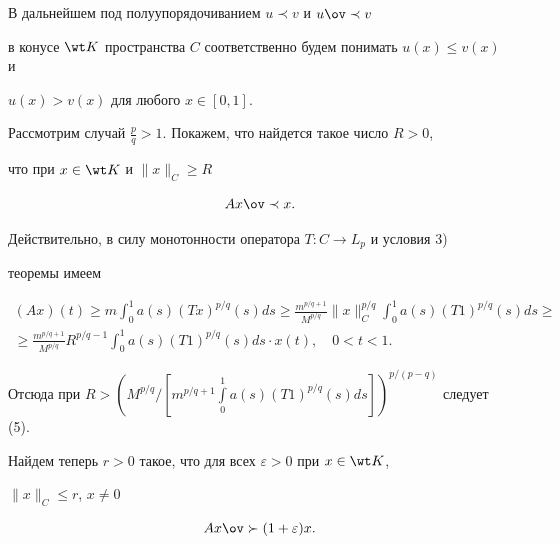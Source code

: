 \begin{pf} 


В дальнейшем под полуупорядочиванием $u\prec v$ и $u\ov\prec v$ 


в конусе $\wt K$ пространства $C$ соответственно будем понимать $u(x)\le 


v(x)$ и 


$u(x)>v(x)$ для любого $x\in[0,1]$. 


 


Рассмотрим случай $\frac{p}{q}>1$. Покажем, что найдется такое число $R>0$, 


что при $x\in\wt K$ и $\|x\|_C\ge R$ 


\begin{equation} 


Ax\ov\prec x. 


\end{equation} 


Действительно, в силу монотонности оператора $T:C\to L_p$ и условия 3) 


теоремы имеем 


\begin{multline*} 


(Ax)(t)\ge m\int^1_0 a(s)(Tx)^{p/q}(s)ds\ge 


\frac{m^{p/q+1}}{M^{p/q}}\|x\|^{p/q}_C\int^1_0 


a(s)(T1)^{p/q}(s)ds\ge \\ 


% 


\ge \frac{m^{p/q+1}}{M^{p/q}}R^{p/q-1}\int^1_0 


a(s)(T1)^{p/q}(s)ds\cdot x(t),\quad 0<t<1. 


\end{multline*} 


Отсюда при $R>\left( M^{p/q}\Big/\left[ m^{p/q+1} \int\limits^1_0 


a(s)(T1)^{p/q}(s)ds\right] \right)^{p/(p-q)}$ следует (5). 


 


Найдем теперь $r>0$ такое, что для всех $\varepsilon>0$ при $x\in\wt K$, 


$\|x\|_C\le r$, $x\ne0$ 


\begin{equation} 


Ax\ov\succ (1+\varepsilon)x. 


\end{equation} 



\end{pf}
